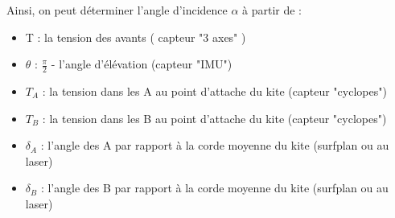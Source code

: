\documentclass[conference]{IEEEtran}
\begin{document}
Ainsi, on peut déterminer l'angle d'incidence $\alpha$ à partir de :
\begin{itemize}
    \item T : la tension des avants ( capteur "3 axes" )
    \item $\theta$ : $\frac{\pi}{2}$ - l'angle d'élévation (capteur "IMU")
    \item $T_A$ : la tension dans les A au point d'attache du kite (capteur "cyclopes")
    \item $T_B$ : la tension dans les B au point d'attache du kite (capteur "cyclopes")
    \item $\delta_A$ : l'angle des A par rapport à la corde moyenne du kite (surfplan ou au laser)
    \item $\delta_B$ : l'angle des B par rapport à la corde moyenne du kite (surfplan ou au laser)
\end{itemize}
\end{document}
